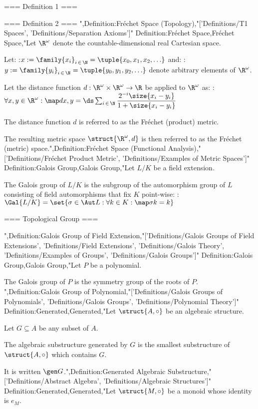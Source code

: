 === Definition 1 ===



=== Definition 2 ===
",Definition:Fréchet Space (Topology),"['Definitions/T1 Spaces', 'Definitions/Separation Axioms']"
Definition:Fréchet Space,Fréchet Space,"Let $\R^\omega$ denote the countable-dimensional real Cartesian space.

Let:
:$x := \family {x_i}_{i \mathop \in \N} = \tuple {x_0, x_1, x_2, \ldots}$
and:
:$y := \family {y_i}_{i \mathop \in \N} = \tuple {y_0, y_1, y_2, \ldots}$
denote arbitrary elements of $\R^\omega$.


Let the distance function $d: \R^\omega \times \R^\omega \to \R$ be applied to $\R^\omega$ as:
:$\forall x, y \in \R^\omega: \map d {x, y} = \ds \sum_{i \mathop \in \N} \dfrac {2^{-i} \size {x_i - y_i} } {1 + \size {x_i - y_i} }$


The distance function $d$ is referred to as the Fréchet (product) metric.


The resulting metric space $\struct {\R^\omega, d}$ is then referred to as the Fréchet (metric) space.",Definition:Fréchet Space (Functional Analysis),"['Definitions/Fréchet Product Metric', 'Definitions/Examples of Metric Spaces']"
Definition:Galois Group,Galois Group,"Let $L / K$ be a field extension.


The Galois group of $L / K$ is the subgroup of the automorphism group of $L$ consisting of field automorphisms that fix $K$ point-wise:
:$\Gal {L / K} = \set {\sigma \in \Aut L: \forall k \in K: \map \sigma k = k}$


=== Topological Group ===

",Definition:Galois Group of Field Extension,"['Definitions/Galois Groups of Field Extensions', 'Definitions/Field Extensions', 'Definitions/Galois Theory', 'Definitions/Examples of Groups', 'Definitions/Galois Groups']"
Definition:Galois Group,Galois Group,"Let $P$ be a polynomial.

The Galois group of $P$ is the symmetry group of the roots of $P$.
",Definition:Galois Group of Polynomial,"['Definitions/Galois Groups of Polynomials', 'Definitions/Galois Groups', 'Definitions/Polynomial Theory']"
Definition:Generated,Generated,"Let $\struct {A, \circ}$ be an algebraic structure.

Let $G \subseteq A$ be any subset of $A$.


The algebraic substructure generated by $G$ is the smallest substructure of $\struct {A, \circ}$ which contains $G$.


It is written $\gen G$.",Definition:Generated Algebraic Substructure,"['Definitions/Abstract Algebra', 'Definitions/Algebraic Structures']"
Definition:Generated,Generated,"Let $\struct {M, \circ}$ be a monoid whose identity is $e_M$.

